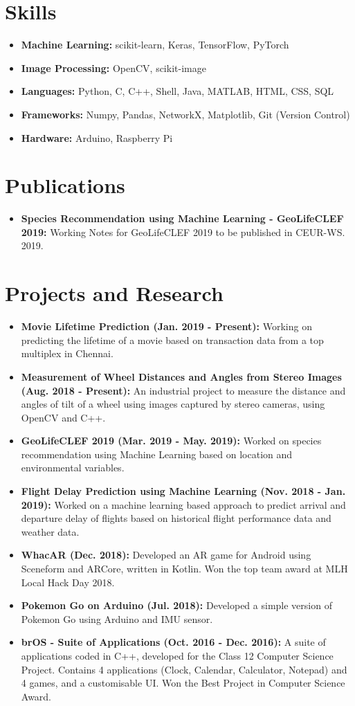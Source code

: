 \documentclass[letterpaper,11pt]{article}
\newcommand{\resumeItem}[2]{
\item\small{
\textbf{#1}{ #2 \vspace{-2pt}}
}
}
\newcommand{\resumeSubHeadingListStart}{\begin{itemize}[leftmargin=*]}
\newcommand{\resumeSubHeadingListEnd}{\end{itemize}}
\begin{document}
\section{Skills}
\resumeSubHeadingListStart
\resumeItem{Machine Learning:}{scikit-learn, Keras, TensorFlow, PyTorch}
\resumeItem{Image Processing:}{OpenCV, scikit-image}
\resumeItem{Languages:}{Python, C, C++, Shell, Java, MATLAB, HTML, CSS, SQL}
\resumeItem{Frameworks:}{Numpy, Pandas, NetworkX, Matplotlib, Git (Version Control)}
\resumeItem{Hardware:}{Arduino, Raspberry Pi}
\resumeSubHeadingListEnd

\section{Publications}
\resumeSubHeadingListStart
\resumeItem{Species Recommendation using Machine Learning - GeoLifeCLEF 2019:}{Working Notes for GeoLifeCLEF 2019 to be published in CEUR-WS. 2019.}
\resumeSubHeadingListEnd

\section{Projects and Research}
\resumeSubHeadingListStart
\resumeItem{Movie Lifetime Prediction (Jan. 2019 - Present):}{Working on predicting the lifetime of a movie based on transaction data from a top multiplex in Chennai.}
\resumeItem{Measurement of Wheel Distances and Angles from Stereo Images (Aug. 2018 - Present):}{An industrial project to measure the distance and angles of tilt of a wheel using images captured by stereo cameras, using OpenCV and C++.}
\resumeItem{GeoLifeCLEF 2019 (Mar. 2019 - May. 2019):}{Worked on species recommendation using Machine Learning based on location and environmental variables.}
\resumeItem{Flight Delay Prediction using Machine Learning (Nov. 2018 - Jan. 2019):}{Worked on a machine learning based approach to predict arrival and departure delay of flights based on historical flight performance data and weather data.}
\resumeItem{WhacAR (Dec. 2018):}{Developed an AR game for Android using Sceneform and ARCore, written in Kotlin. Won the top team award at MLH Local Hack Day 2018.}
\resumeItem{Pokemon Go on Arduino (Jul. 2018):}{Developed a simple version of Pokemon Go using Arduino and IMU sensor.}
\resumeItem{brOS - Suite of Applications (Oct. 2016 - Dec. 2016):}{A suite of applications coded in C++, developed for the Class 12 Computer Science Project. Contains 4 applications (Clock, Calendar, Calculator, Notepad) and 4 games, and a customisable UI. Won the Best Project in Computer Science Award.}
\resumeSubHeadingListEnd
\end{document}
